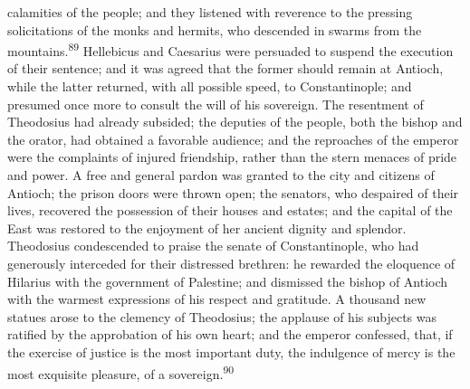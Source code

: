 calamities of the people; and they listened with reverence to the
pressing solicitations of the monks and hermits, who descended in
swarms from the mountains.\textsuperscript{89} Hellebicus and Caesarius were
persuaded to suspend the execution of their sentence; and it was
agreed that the former should remain at Antioch, while the latter
returned, with all possible speed, to Constantinople; and
presumed once more to consult the will of his sovereign. The
resentment of Theodosius had already subsided; the deputies of
the people, both the bishop and the orator, had obtained a
favorable audience; and the reproaches of the emperor were the
complaints of injured friendship, rather than the stern menaces
of pride and power. A free and general pardon was granted to the
city and citizens of Antioch; the prison doors were thrown open;
the senators, who despaired of their lives, recovered the
possession of their houses and estates; and the capital of the
East was restored to the enjoyment of her ancient dignity and
splendor. Theodosius condescended to praise the senate of
Constantinople, who had generously interceded for their
distressed brethren: he rewarded the eloquence of Hilarius with
the government of Palestine; and dismissed the bishop of Antioch
with the warmest expressions of his respect and gratitude. A
thousand new statues arose to the clemency of Theodosius; the
applause of his subjects was ratified by the approbation of his
own heart; and the emperor confessed, that, if the exercise of
justice is the most important duty, the indulgence of mercy is
the most exquisite pleasure, of a sovereign.\textsuperscript{90}





